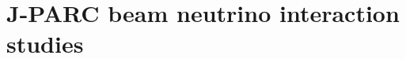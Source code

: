 


\pagebreak
\newpage
\chapter{J-PARC beam neutrino interaction studies}
\label{c:neutrinoT2K}







 
